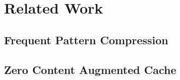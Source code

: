 \chapter{Related Work}
\label{ch:Related Work}

\section{Frequent Pattern Compression}
\label{sec:fpc}

\section{Zero Content Augmented Cache}
\label{sec:zca}

\section{}